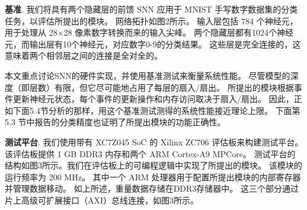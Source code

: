 \textbf{基准}.
我们将具有两个隐藏层的前馈 SNN 应用于 MNIST 手写数字数据集的分类任务，以评估所提出的模块。
网络拓扑如图2所示。
输入层包括 784 个神经元，用于处理从 28$\times$28 像素数字转换而来的输入尖峰。
两个隐藏层都有1024个神经元，而输出层有10个神经元，对应数字0-9的分类结果。
这些层是完全连接的，这意味着两个相邻层之间的连接是全对全的。

本文重点讨论SNN的硬件实现，并使用基准测试来衡量系统性能。
尽管模型的深度（即层数）有限，但它尽可能地占用了每层的扇入/扇出。
所提出的模块根据事件更新神经元状态，每个事件的更新操作和内存访问取决于扇入/扇出。
因此，正如下面5.4节分析的那样，用这个基准测试测得的系统性能接近理论上限。
下面第 5.3 节中报告的分类精度也证明了所提出模块的功能正确性。




\textbf{测试平台}.
我们使用带有 XC7Z045 SoC 的 Xilinx ZC706 评估板来构建测试平台。
该评估板提供 1 GB DDR3 内存和两个 ARM Cortex-A9 MPCore。
测试平台的结构如图3所示。我们在评估板上的可编程逻辑中实现了所提出的模块。
该模块的运行频率为 200 MHz。
其中一个 ARM 处理器用于配置所提出模块的内部寄存器并管理数据移动。
如上所述，重量数据存储在DDR3存储器中。
这三个部分通过片上高级可扩展接口（AXI）总线连接，如图3所示。


